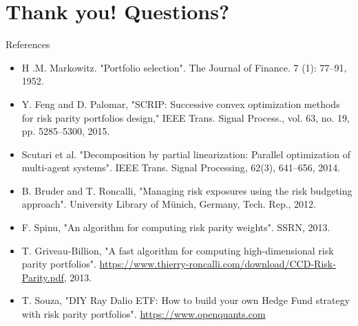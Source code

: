 \documentclass[aspectratio=169]{beamer}
\begin{document}
\section{Thank you! Questions?}

\begin{frame}{References}
  \vspace{.5cm}
  \begin{itemize}
    \item {\footnotesize H .M. Markowitz. "Portfolio selection". The Journal of Finance. 7 (1): 77–91, 1952.}
    \item {\footnotesize Y. Feng and D. Palomar, "SCRIP: Successive convex optimization methods for risk parity portfolios design,"
           IEEE Trans. Signal Process., vol. 63, no. 19, pp. 5285–5300, 2015.}
    \item {\footnotesize Scutari et al. "Decomposition by partial linearization: Parallel optimization of multi-agent systems".
           IEEE Trans. Signal Processing, 62(3), 641–656, 2014.}
    \item {\footnotesize B. Bruder and T. Roncalli, "Managing risk exposures using the risk budgeting approach".
           University Library of M\"unich, Germany, Tech. Rep., 2012.}
    \item {\footnotesize F. Spinu, "An algorithm for computing risk parity weights". SSRN, 2013.}
    \item {\footnotesize T. Griveau-Billion, "A fast algorithm for computing high-dimensional risk parity portfolios".
           \url{https://www.thierry-roncalli.com/download/CCD-Risk-Parity.pdf}, 2013.}
    \item {\footnotesize T. Souza, "DIY Ray Dalio ETF: How to build your own Hedge Fund strategy with risk parity portfolios".
           \url{https://www.openquants.com}}
  \end{itemize}
\end{frame}
\end{document}
